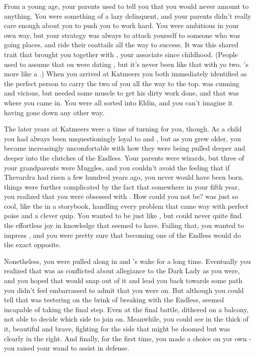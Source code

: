 \documentclass[char]{Katmeers}
\begin{document}
\name{\cGhost{}}


From a young age, your parents used to tell you that you would never amount to anything. You were something of a lazy delinquent, and your parents didn't really care enough about you to push you to work hard. You were ambitious in your own way, but your strategy was always to attach yourself to someone who was going places, and ride their coattails all the way to success. It was this shared trait that brought you together with \cGoyle{\formal}, your associate since childhood. (People used to assume that ou were dating \cGoyle{\them}, but it's never been like that with yo two. \cGoyle{\They}'s more like a \cGoyle{\sibling}.) When you arrived at Katmeers you both immediately identified \cMalfoy{\formal} as the perfect person to carry the two of you all the way to the top. \cMalfoy{\They} was cunning and vicious, but \cMalfoy{\they} needed some muscle to get his dirty work done, and that was where you came in. You were all sorted into Eldin, and you can't imagine it having gone down any other way.

The later years at Katmeers were a time of turning for you, though. As a child you had always been unquestioningly loyal to \cMalfoy{\formal} and \cGoyle{\formal}, but as you grew older, you became increasingly uncomfortable with how they were being pulled deeper and deeper into the clutches of the Endless. Your parents were wizards, but three of your grandparents were Muggles, and you couldn't avoid the feeling that if Thevardra had risen a few hundred years ago, you never would have been born. things were further complicated by the fact that somewhere in your fifth year, you realized that you were obsessed with \cHermione{}. How could you not be? \cHermione{\They} was just so cool, like the \cHermione{\hero} in a storybook, handling every problem that came \cHermione{\their} way with perfect poise and a clever quip. You wanted to be just like \cHermione{}, but could never quite find the  effortless joy in knowledge that \cHermione{\they} seemed to have. Failing that, you wanted to impress \cHermione{\them}, and you were pretty sure that becoming one of the Endless would do the exact opposite.

Nonetheless, you were pulled along in \cMalfoy{\formal} and \cGoyle{\formal}'s wake for a long time. Eventually you realized that \cMalfoy{\formal} was as conflicted about \cMalfoy{\their} allegiance to the Dark Lady as you were, and you hoped that \cMalfoy{\they} would snap out of it and lead you back towards some path you didn't feel embarrassed to admit that you were on. But although you could tell that \cMalfoy{\they} was teetering on the brink of breaking with the Endless, \cMalfoy{\they} seemed incapable of taking the final step. Even at the final battle, \cMalfoy{\they} dithered on a balcony, not able to decide which side to join on. Meanwhile, you could see \cHermione{} in the thick of it, beautiful and brave, fighting for the side that might be doomed but was clearly in the right. And finally, for the first time, you made a choice on yor own - you raised your wand to assist in \cHermione{\their} defense.
\end{document}
